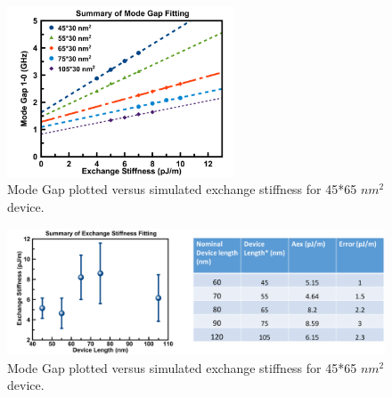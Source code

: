 \begin{figure}[!ht]
\centering
{}
\caption{}
\end{figure}

\begin{figure}[!ht]
  \centering
  \includegraphics[width=0.6\textwidth]{fig/45nm/45nmsim}
   \caption{Mode Gap plotted versus simulated exchange stiffness for 45*65 $nm^2$ device.}
  \label{fig:45nmsim}
\end{figure}


\begin{figure}[!ht]
  \centering
  \includegraphics[width=1.0\textwidth]{fig/45nm/45nmex}
   \caption{Mode Gap plotted versus simulated exchange stiffness for 45*65 $nm^2$ device.}
  \label{fig:45nmex}
\end{figure}
